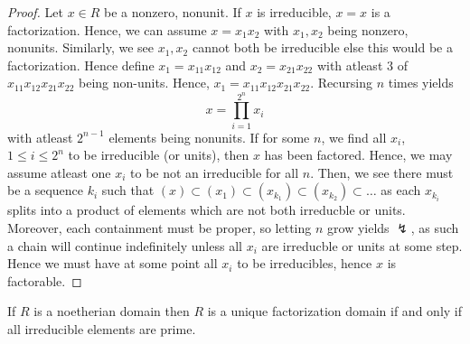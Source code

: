 \begin{proof}
Let \(x \in R\) be a nonzero, nonunit. If \(x\) is irreducible, \(x =x\) is a factorization. Hence, we can assume \(x = x_1 x_2\) with \(x_1, x_2\) being nonzero, nonunits. Similarly, we see \(x_1, x_2\) cannot both be irreducible else this would be a factorization. Hence define \(x_1 = x_{11} x_{12}\) and \(x_2 = x_{21} x_{22}\) with atleast \(3\) of \(x_{11} x_{12} x_{21} x_{22}\) being non-units. Hence, \(x_1 = x_{11}x_{12} x_{21} x_{22}\). Recursing \(n\) times yields \[
x= \prod_{i= 1}^{2^{n}} x_{i}
\] with atleast \(2^{n-1}\) elements being nonunits. If for some \(n\), we find all \(x_{i}\), \(1 \le i \le 2^{n}\) to be irreducible (or units), then \(x\) has been factored. Hence, we may assume atleast one \(x_{i}\) to be not an irreducible for all \(n\). Then, we see there must be a sequence \(k_{i}\) such that   \(\left( x \right) \subset \left( x_1 \right) \subset\left( x_{k_1} \right) \subset \left( x_{k_2} \right)\subset \ldots  \) as each \(x_{k_i}\) splits into a product of elements which are not both irreducble or units. Moreover, each containment must be proper, so letting \(n\) grow yields \(\lightning\), as such a chain will continue indefinitely unless all \(x_{i}\) are irreducble or units at some step. Hence we must have at some point all \(x_{i}\) to be irreducibles, hence \(x\) is factorable.
\end{proof}
\begin{theorem}
	If \(R\) is a noetherian domain then \(R\) is a unique factorization domain if and only if all irreducible elements are prime.
\end{theorem}
